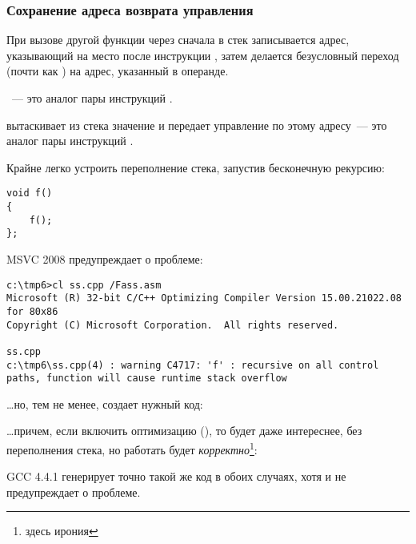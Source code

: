 \subsubsection{Сохранение адреса возврата управления}


При вызове другой функции через \CALL сначала в стек записывается адрес, указывающий на место после 
инструкции \CALL, затем делается безусловный переход (почти как ) на адрес, указанный в операнде.

\CALL~--- это аналог пары инструкций .

\RET вытаскивает из стека значение и передает управление по этому адресу~--- 
это аналог пары инструкций .

\myindex{\Stack!\MLStackOverflow}
\myindex{\Recursion}
Крайне легко устроить переполнение стека, запустив бесконечную рекурсию:

\begin{lstlisting}[style=customc]
void f()
{
	f();
};
\end{lstlisting}

MSVC 2008 предупреждает о проблеме:

\begin{lstlisting}
c:\tmp6>cl ss.cpp /Fass.asm
Microsoft (R) 32-bit C/C++ Optimizing Compiler Version 15.00.21022.08 for 80x86
Copyright (C) Microsoft Corporation.  All rights reserved.

ss.cpp
c:\tmp6\ss.cpp(4) : warning C4717: 'f' : recursive on all control paths, function will cause runtime stack overflow
\end{lstlisting}

\dots но, тем не менее, создает нужный код:



\dots причем, если включить оптимизацию (\TT{\Ox}), то будет даже интереснее, без переполнения стека, 
но работать будет \emph{корректно}\footnote{здесь ирония}:



GCC 4.4.1 генерирует точно такой же код в обоих случаях, хотя и не предупреждает о проблеме.


